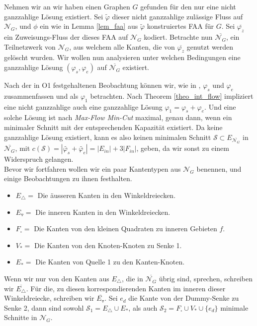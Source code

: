 Nehmen wir an wir haben einen Graphen $G$ gefunden für den nur eine nicht ganzzahlige Lösung existiert. Sei $\tilde{\varphi}$ dieser nicht ganzzahlige zulässige Fluss auf $\mathcal{N}_G$, und $\phi$ ein wie in Lemma \ref{lem_faa} aus $\tilde{\varphi}$ konstruiertes FAA für $G$. Sei $\overline{\varphi_z}$ ein Zuweisungs-Fluss der dieses FAA auf $\mathcal{N}_G$ kodiert. Betrachte nun $\overline{\mathcal{N}_G}$, ein Teilnetzwerk von $\mathcal{N}_G$, aus welchem alle Kanten, die von $\overline{\varphi_z}$ genutzt werden gelöscht wurden. Wir wollen nun analysieren unter welchen Bedingungen eine ganzzahlige Lösung $(\varphi_s,\varphi_e)$ auf $\overline{\mathcal{N}_G}$ existiert.

Nach der in O1 festgehaltenen Beobachtung können wir, wie in \cite{af15}, $\varphi_s$ und $\varphi_e$ zusammenfassen und als $\varphi_1$ betrachten. Nach Theorem \ref{theo_int_flow} impliziert eine nicht ganzzahlige auch eine ganzzahlige Lösung $\varphi_1=\varphi_s+\varphi_e$. Und eine solche Lösung ist nach \textit{Max-Flow Min-Cut} maximal, genau dann, wenn ein minimaler Schnitt mit der entsprechenden Kapazität existiert. Da keine ganzzahlige Lösung existiert, kann es also keinen minimalen Schnitt $\mathcal{S} \subset E_{\overline{\mathcal{N}_G}}$ in $\overline{\mathcal{N}_G}$, mit $c(\mathcal{S}) = |\tilde{\varphi_s}+\tilde{\varphi_e}| = |E_{in}| + 3|F_{in}|$, geben, da wir sonst zu einem Widerspruch gelangen.\\

Bevor wir fortfahren wollen wir ein paar Kantentypen aus $\mathcal{N}_G$ benennen, und einige Beobachtungen zu ihnen festhalten.

\begin{itemize}
\item $E_\triangle = $ Die äusseren Kanten in den Winkeldreiecken.
\item $E_\triangledown= $ Die inneren Kanten in den Winkeldreiecken.
\item $F_\square = $ Die Kanten von den kleinen Quadraten zu inneren Gebieten $f$.
\item $V_{*} = $ Die Kanten von den Knoten-Knoten zu Senke 1.
\item $E_{*} = $ Die Kanten von Quelle 1 zu den Kanten-Knoten.
\end{itemize}

Wenn wir nur von den Kanten aus $E_\triangle$, die in $\overline{\mathcal{N}_G}$ übrig sind, sprechen, schreiben wir $\overline{E_\triangle}$. Für die, zu diesen korrespondierenden Kanten im inneren dieser Winkeldreiecke, schreiben wir $\overline{E_\triangledown}$. Sei $e_{d}$ die Kante von der Dummy-Senke zu Senke 2, dann sind sowohl $\mathcal{S}_1 = E_\triangle \cup E_{*}$, als auch $\mathcal{S}_2 = F_\square \cup V_{*} \cup \{e_{d}\}$ minimale Schnitte in $\mathcal{N}_G$.

